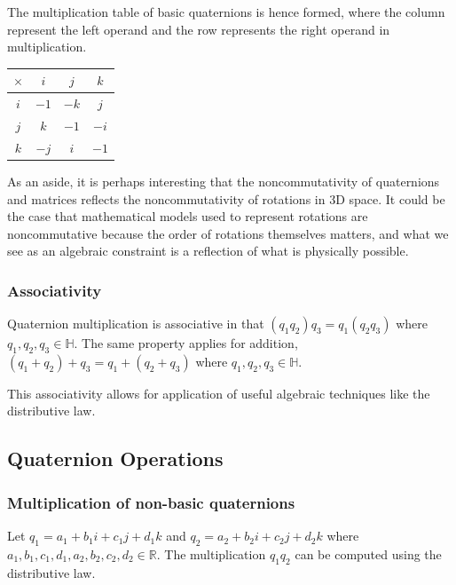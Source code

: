 \documentclass[12pt, a4paper]{article}
\begin{document}
The multiplication table of basic quaternions is hence formed, where the column
represent the left operand and the row represents the right operand in
multiplication.

\begin{center}
    \doublespacing
    \begin{tabular}{ | c | c | c | c | }
        \hline
        $\times$ & $i$  & $j$  & $k$  \\
        \hline
        $i$      & $-1$ & $-k$ & $j$  \\
        \hline
        $j$      & $k$  & $-1$ & $-i$ \\
        \hline
        $k$      & $-j$ & $i$  & $-1$ \\
        \hline
    \end{tabular}
    \label{sophisticatedtable}
\end{center}

As an aside, it is perhaps interesting that the noncommutativity of quaternions
and matrices reflects the noncommutativity of rotations in 3D space. It could be
the case that mathematical models used to represent rotations are noncommutative
because the order of rotations themselves matters, and what we see as an
algebraic constraint is a reflection of what is physically possible. \\  

\subsubsection{Associativity}
Quaternion multiplication is associative in that $(q_1 q_2) q_3 = q_1 (q_2 q_3)$
where $q_1,q_2,q_3 \in \mathbb{H}$.
The same property applies for addition, $(q_1 + q_2) + q_3 = q_1 + (q_2 + q_3)$
where $q_1,q_2,q_3 \in \mathbb{H}$.

This associativity allows for application of useful algebraic
techniques like the distributive law.

\subsection{Quaternion Operations}
\subsubsection{Multiplication of non-basic quaternions}
Let $q_1 = a_1 + b_1i + c_1j + d_1k$ and $q_2 = a_2 + b_2i + c_2j + d_2k$ where
$a_1, b_1, c_1, d_1, a_2, b_2, c_2, d_2 \in \mathbb{R}$. The multiplication
$q_1q_2$ can be computed using the distributive law.
\end{document}
